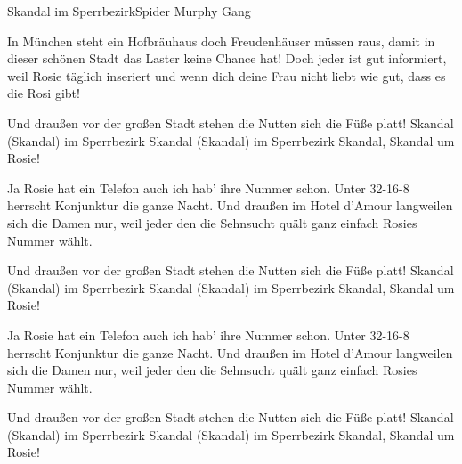 \begin{song}{Skandal im Sperrbezirk}{Spider Murphy Gang}{}

In München steht ein Hofbräuhaus doch Freudenhäuser müssen raus,
damit in dieser schönen Stadt das Laster keine Chance hat!
Doch jeder ist gut informiert, weil Rosie täglich inseriert
und wenn dich deine Frau nicht liebt wie gut, dass es die Rosi gibt!

Und draußen vor der großen Stadt stehen die Nutten sich die Füße platt!
Skandal (Skandal) im Sperrbezirk Skandal (Skandal) im Sperrbezirk
Skandal,   Skandal um Rosie!


Ja Rosie hat ein Telefon auch ich hab' ihre Nummer schon.
Unter 32-16-8 herrscht Konjunktur die ganze Nacht.
Und draußen im Hotel d'Amour langweilen sich die Damen nur,
weil jeder den die Sehnsucht quält ganz einfach Rosies Nummer wählt.

Und draußen vor der großen Stadt stehen die Nutten sich die Füße platt!
Skandal (Skandal) im Sperrbezirk Skandal (Skandal) im Sperrbezirk
Skandal,   Skandal um Rosie!


Ja Rosie hat ein Telefon auch ich hab' ihre Nummer schon.
Unter 32-16-8 herrscht Konjunktur die ganze Nacht.
Und draußen im Hotel d'Amour langweilen sich die Damen nur,
weil jeder den die Sehnsucht quält ganz einfach Rosies Nummer wählt.

Und draußen vor der großen Stadt stehen die Nutten sich die Füße platt!
Skandal (Skandal) im Sperrbezirk Skandal (Skandal) im Sperrbezirk
Skandal,   Skandal um Rosie!


\end{song}
